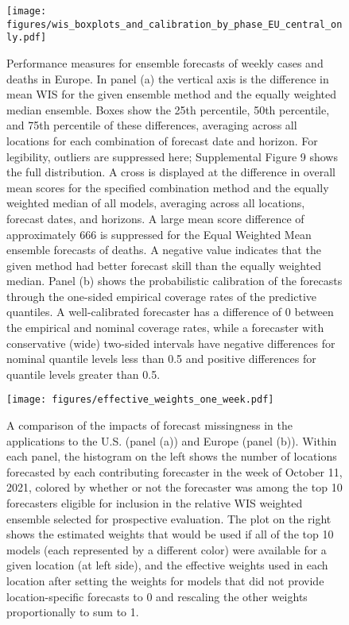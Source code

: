 \documentclass[11pt,3p,authoryear]{elsarticle}
\begin{document}
\begin{figure}
\texttt{[image: figures/wis\_boxplots\_and\_calibration\_by\_phase\_EU\_central\_only.pdf]}
\caption{Performance measures for ensemble forecasts of weekly cases and deaths in Europe. In panel (a) the vertical axis is the difference in mean WIS for the given ensemble method and the equally weighted median ensemble.
Boxes show the 25th percentile, 50th percentile, and 75th percentile of these differences, averaging across all locations for each combination of forecast date and horizon.
For legibility, outliers are suppressed here; Supplemental Figure 9 shows the full distribution.
A cross is displayed at the difference in overall mean scores for the specified combination method and the equally weighted median of all models, averaging across all locations, forecast dates, and horizons.
A large mean score difference of approximately 666 is suppressed for the Equal Weighted Mean ensemble forecasts of deaths.
A negative value indicates that the given method had better forecast skill than the equally weighted median.
Panel (b) shows the probabilistic calibration of the forecasts through the one-sided empirical coverage rates of the predictive quantiles.
A well-calibrated forecaster has a difference of 0 between the empirical and nominal coverage rates, while a forecaster with conservative (wide) two-sided intervals have negative differences for nominal quantile levels less than 0.5 and positive differences for quantile levels greater than 0.5.
}
\label{fig:wis_boxplots_and_calibration_by_phase_EU_central_only}
\end{figure}

\begin{figure}
\texttt{[image: figures/effective\_weights\_one\_week.pdf]}
\caption{A comparison of the impacts of forecast missingness in the applications to the U.S. (panel (a)) and Europe (panel (b)). Within each panel, the histogram on the left shows the number of locations forecasted by each contributing forecaster in the week of October 11, 2021, colored by whether or not the forecaster was among the top 10 forecasters eligible for inclusion in the relative WIS weighted ensemble selected for prospective evaluation. The plot on the right shows the estimated weights that would be used if all of the top 10 models (each represented by a different color) were available for a given location (at left side), and the effective weights used in each location after setting the weights for models that did not provide location-specific forecasts to 0 and rescaling the other weights proportionally to sum to 1.}
\label{fig:component_missingness}
\end{figure}
\end{document}
